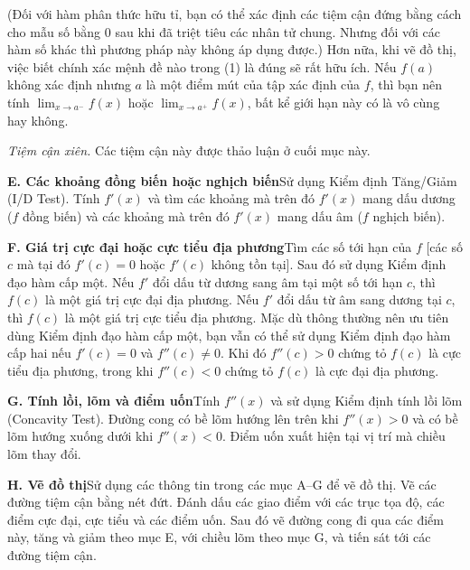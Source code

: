 \documentclass[10pt]{article}
\begin{document}
(Đối với hàm phân thức hữu tỉ, bạn có thể xác định các tiệm cận đứng bằng cách cho mẫu số bằng $0$ sau khi đã triệt tiêu các nhân tử chung. Nhưng đối với các hàm số khác thì phương pháp này không áp dụng được.) Hơn nữa, khi vẽ đồ thị, việc biết chính xác mệnh đề nào trong (1) là đúng sẽ rất hữu ích. Nếu $f(a)$ không xác định nhưng $a$ là một điểm mút của tập xác định của $f$, thì bạn nên tính $\lim_{x \to a^-} f(x)$ hoặc $\lim_{x \to a^+} f(x)$, bất kể giới hạn này có là vô cùng hay không.
\par\vspace{5pt}

\noindent{}\textit{Tiệm cận xiên.} Các tiệm cận này được thảo luận ở cuối mục này.
\par
\endgroup

\vspace{6pt}
\noindent
\textbf{E. Các khoảng đồng biến hoặc nghịch biến}\quad Sử dụng Kiểm định Tăng/Giảm (I/D Test). Tính $f'(x)$ và tìm các khoảng mà trên đó $f'(x)$ mang dấu dương ($f$ đồng biến) và các khoảng mà trên đó $f'(x)$ mang dấu âm ($f$ nghịch biến).

\vspace{6pt}
\noindent
\textbf{F. Giá trị cực đại hoặc cực tiểu địa phương}\quad Tìm các số tới hạn của $f$ [các số $c$ mà tại đó $f'(c) = 0$ hoặc $f'(c)$ không tồn tại]. Sau đó sử dụng Kiểm định đạo hàm cấp một. Nếu $f'$ đổi dấu từ dương sang âm tại một số tới hạn $c$, thì $f(c)$ là một giá trị cực đại địa phương. Nếu $f'$ đổi dấu từ âm sang dương tại $c$, thì $f(c)$ là một giá trị cực tiểu địa phương. Mặc dù thông thường nên ưu tiên dùng Kiểm định đạo hàm cấp một, bạn vẫn có thể sử dụng Kiểm định đạo hàm cấp hai nếu $f'(c) = 0$ và $f''(c) \ne 0$. Khi đó $f''(c) > 0$ chứng tỏ $f(c)$ là cực tiểu địa phương, trong khi $f''(c) < 0$ chứng tỏ $f(c)$ là cực đại địa phương.

\vspace{6pt}
\noindent
\textbf{G. Tính lồi, lõm và điểm uốn}\quad Tính $f''(x)$ và sử dụng Kiểm định tính lồi lõm (Concavity Test). Đường cong có bề lõm hướng lên trên khi $f''(x) > 0$ và có bề lõm hướng xuống dưới khi $f''(x) < 0$. Điểm uốn xuất hiện tại vị trí mà chiều lõm thay đổi.

\vspace{6pt}
\noindent
\textbf{H. Vẽ đồ thị}\quad Sử dụng các thông tin trong các mục A--G để vẽ đồ thị. Vẽ các đường tiệm cận bằng nét đứt. Đánh dấu các giao điểm với các trục tọa độ, các điểm cực đại, cực tiểu và các điểm uốn. Sau đó vẽ đường cong đi qua các điểm này, tăng và giảm theo mục E, với chiều lõm theo mục G, và tiến sát tới các đường tiệm cận.
\end{document}
